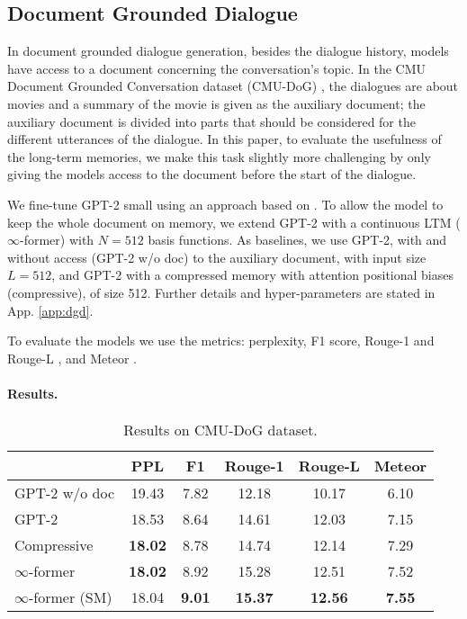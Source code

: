 \documentclass[11pt]{article}
\begin{document}
\subsection{Document Grounded Dialogue}
\label{sec:dgg}
In document grounded dialogue generation, besides the dialogue history, models have access to a document concerning the conversation's topic. In the CMU Document Grounded Conversation dataset (CMU-DoG) \citep{zhou2018dataset}, the dialogues are about movies and a summary of the movie is given as the auxiliary document; the auxiliary document is divided into parts that should be considered for the different utterances of the dialogue. In this paper, to evaluate the usefulness of the long-term memories, we make this task slightly more challenging by only giving the models access to the document before the start of the dialogue.

We fine-tune \mbox{GPT-2} small \citep{radford2019language} using an approach based on \citet{wolf2019transfertransfo}. To allow the model to keep the whole document on memory, we extend GPT-2 with a continuous LTM ($\infty$-former) with $N=512$ basis functions.
As baselines, we use GPT-2, with and without access (GPT-2 w/o doc) to the auxiliary document, with  input size $L=512$, and GPT-2 with a compressed memory with attention positional biases (compressive), of size 512. Further details and hyper-parameters are stated in App. \ref{app:dgd}. 

To evaluate the models we use the metrics: perplexity, F1 score, Rouge-1 and Rouge-L \citep{lin2004rouge}, and Meteor \citep{banerjee2005meteor}.


\paragraph{Results. }
\begin{table}[t]
\centering \small
\setlength{\tabcolsep}{0.7ex}
\begin{tabular}{l@{\hspace{1ex}}c@{\hspace{2ex}}cccc}
\toprule
& PPL & F1 & Rouge-1 & Rouge-L & Meteor \\
\midrule
GPT-2 w/o doc & 19.43 & 7.82 & 12.18 & 10.17 & 6.10    \\
GPT-2 & 18.53 & 8.64 & 14.61 & 12.03 & 7.15  \\
Compressive & \textbf{18.02} & 8.78 & 14.74 & 12.14 & 7.29  \\
$\infty$-former & \textbf{18.02} & 8.92 & 15.28 & 12.51 & 7.52  \\
$\infty$-former (SM) & 18.04 & \textbf{9.01} & \textbf{15.37} & \textbf{12.56} & \textbf{7.55} \\
\bottomrule
\end{tabular}
\caption{Results on CMU-DoG dataset.}
\label{table:dgg}
\end{table}
\end{document}
